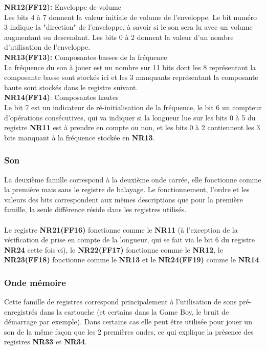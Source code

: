 \documentclass[french]{report}
\begin{document}
	\textbf{NR12(FF12):} Enveloppe de volume \\
		Les bits 4 à 7 donnent la valeur initiale de volume de
		l'enveloppe.
		Le bit numéro 3 indique la "direction" de l'enveloppe,
		à savoir si le son sera lu avec un volume augmentant
		ou descendant.
		Les bits 0 à 2 donnent la valeur d'un nombre
		d'utilisation de l'enveloppe.\\ 
	
	\textbf{NR13(FF13):} Composantes basses de la fréquence \\
		La fréquence du son à jouer est un nombre sur 11 bits
		dont les 8 représentant la composante basse sont
		stockés ici et les 3 manquants représentant la
		composante haute sont stockés dans le registre
		suivant.\\ 

	\textbf{NR14(FF14)}: Composantes hautes \\
		Le bit 7 est un indicateur de ré-initialisation de la
		fréquence, le bit 6 un compteur d'opérations
		consécutives, qui va indiquer si la longueur lue sur
		les bits 0 à 5 du registre \textbf{NR11} est à prendre en
		compte ou non, et les bits 0 à 2 contiennent les 3 bits
		manquant à la fréquence stockée en \textbf{NR13}.
	\subsubsection{Son}
		La deuxième famille correspond à la deuxième onde carrée, elle
		fonctionne comme la première mais sans le registre de
		balayage. Le fonctionnement, l'ordre et les valeurs des bits
		correspondent aux mêmes descriptions que pour la première
		famille, la seule différence réside dans les registres
		utilisés.\\ \\
	
	Le registre \textbf{NR21(FF16)} fonctionne comme le \textbf{NR11} (à
		l'exception de la vérification de prise en compte de
		la longueur, qui se fait via le bit 6 du registre \textbf{NR24}
		cette fois ci), le \textbf{NR22(FF17)} fonctionne comme le
		\textbf{NR12}, le \textbf{NR23(FF18)} fonctionne comme le \textbf{NR13} et le
		\textbf{NR24(FF19)} comme le \textbf{NR14}. 
			
	\subsubsection{Onde mémoire}
		Cette famille de registres correspond principalement à
		l'utilisation de sons pré-enregistrés dans la cartouche
		(et certains dans la Game Boy, le bruit de démarrage par
		exemple).
		Dans certains cas elle peut être utilisée pour jouer un son de
		la même façon que les 2 premières ondes, ce qui explique la
		présence des registres \textbf{NR33} et \textbf{NR34}. \\ 
		
\end{document}
